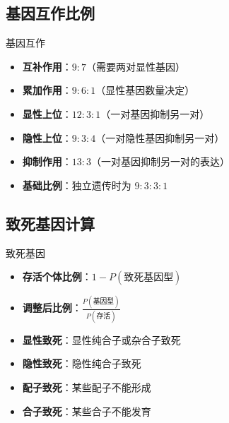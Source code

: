 \documentclass[a4paper,11pt]{ctexart}
\begin{document}
\subsection{基因互作比例}

\begin{lemmabox}{基因互作}
\begin{itemize}[leftmargin=2em]
    \item \textbf{互补作用}：$9:7$（需要两对显性基因）
    \item \textbf{累加作用}：$9:6:1$（显性基因数量决定）
    \item \textbf{显性上位}：$12:3:1$（一对基因抑制另一对）
    \item \textbf{隐性上位}：$9:3:4$（一对隐性基因抑制另一对）
    \item \textbf{抑制作用}：$13:3$（一对基因抑制另一对的表达）
    \item \textbf{基础比例}：独立遗传时为 $9:3:3:1$
\end{itemize}
\end{lemmabox}

\subsection{致死基因计算}

\begin{lemmabox}{致死基因}
\begin{itemize}[leftmargin=2em]
    \item \textbf{存活个体比例}：$1 - P(\text{致死基因型})$
    \item \textbf{调整后比例}：$\frac{P(\text{基因型})}{P(\text{存活})}$
    \item \textbf{显性致死}：显性纯合子或杂合子致死
    \item \textbf{隐性致死}：隐性纯合子致死
    \item \textbf{配子致死}：某些配子不能形成
    \item \textbf{合子致死}：某些合子不能发育
\end{itemize}
\end{lemmabox}

\end{document}
